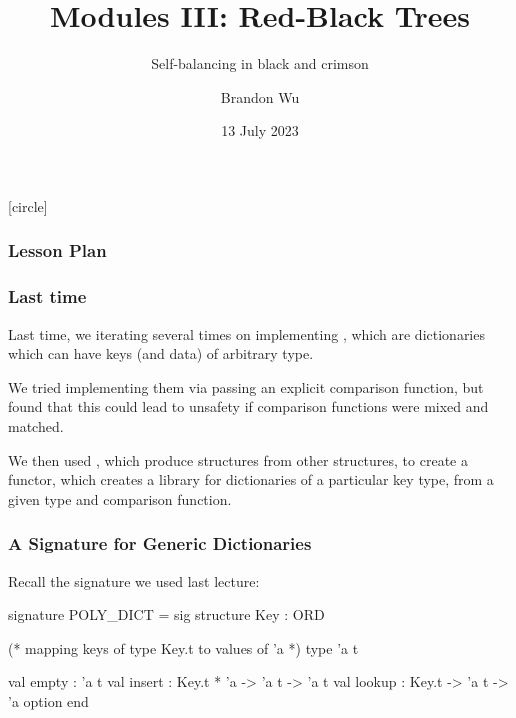 \documentclass[aspectratio=169]{beamer}
\title{Modules III: Red-Black Trees} %
\subtitle{Self-balancing in black and crimson} %
\date{13 July 2023} %
\author{Brandon Wu} %
\newif\ifcolorlambda
\begin{document}
\ifweb
    \renewcommand{\pause}{}
\fi

[circle]

{
\begin{frame}[plain]
    \colorlambdatrue
    \titlepage
\end{frame}
}


\begin{frame}[fragile]
  \frametitle{Lesson Plan}

  \tableofcontents
\end{frame}

\begin{frame}[fragile]
  \frametitle{Last time}

  Last time, we iterating several times on implementing ,
  which are dictionaries which can have keys (and data) of arbitrary type.

  \pause
  \vspace{\fill}

  We tried implementing them via passing an explicit comparison function, but found
  that this could lead to unsafety if comparison functions were mixed and matched.

  \pause
  \vspace{\fill}

  We then used , which produce structures from other structures, to
  create a  functor, which creates a library for dictionaries of a
  particular key type, from a given type and comparison function.
\end{frame}


\begin{frame}[fragile]
  \frametitle{A Signature for Generic Dictionaries}

  Recall the  signature we used last lecture:

  \begin{codeblock}
    signature POLY_DICT =
      sig
        structure Key : ORD

        (* mapping keys of type Key.t to values of 'a *)
        type 'a t

        val empty : 'a t
        val insert : Key.t * 'a -> 'a t -> 'a t
        val lookup : Key.t -> 'a t -> 'a option
      end
  \end{codeblock}
\end{frame}
\end{document}
